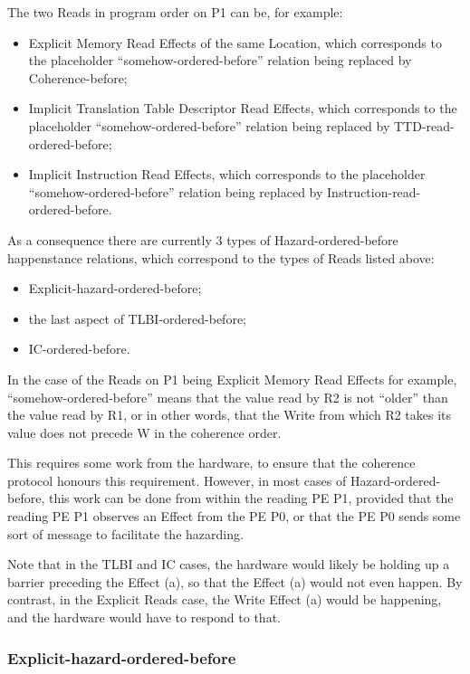 \documentclass{book}
\begin{document}
The two Reads in program order on P1 can be, for
example:  
\begin{itemize}
\item Explicit Memory Read Effects of the same
Location, which corresponds to the placeholder
``somehow-ordered-before'' relation being replaced by
Coherence-before; 
\item Implicit Translation Table Descriptor Read
Effects, which corresponds to the placeholder
``somehow-ordered-before'' relation being replaced by
TTD-read-ordered-before; 
\item Implicit Instruction Read Effects, which
corresponds to the placeholder
``somehow-ordered-before'' relation being replaced by
Instruction-read-ordered-before.  
\end{itemize}

As a consequence there are currently 3 types of
Hazard-ordered-before happenstance relations, which
correspond to the types of Reads listed above: 
\begin{itemize}
\item Explicit-hazard-ordered-before; 
\item the last aspect of TLBI-ordered-before; 
\item IC-ordered-before. 
\end{itemize} 

In the case of the Reads on P1 being Explicit Memory
Read Effects for example, ``somehow-ordered-before''
means that the value read by R2 is not “older” than
the value read by R1, or in other words, that the
Write from which R2 takes its value does not precede
W in the coherence order.  
 
This requires some work from the hardware, to ensure
that the coherence protocol honours this requirement.
However, in most cases of Hazard-ordered-before, this
work can be done from within the reading PE P1,
provided that the reading PE P1 observes an Effect
from the PE P0, or that the PE P0 sends some sort of
message to facilitate the hazarding.  
 
Note that in the TLBI and IC cases, the hardware
would likely be holding up a barrier preceding the
Effect (a), so that the Effect (a) would not even
happen. By contrast, in the Explicit Reads case, the
Write Effect (a) would be happening, and the hardware
would have to respond to that. 

\subsubsection{Explicit-hazard-ordered-before}
\end{document}
